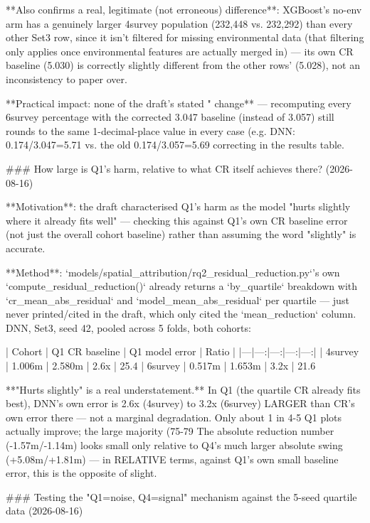 **Also confirms a real, legitimate (not erroneous) difference**: XGBoost's no-env arm has a
genuinely larger 4survey population (232,448 vs. 232,292) than every other Set3 row, since it
isn't filtered for missing environmental data (that filtering only applies once environmental
features are actually merged in) — its own CR baseline (5.030) is correctly slightly different
from the other rows' (5.028), not an inconsistency to paper over.

**Practical impact: none of the draft's stated "%
change** — recomputing every 6survey percentage with the corrected 3.047 baseline (instead of
3.057) still rounds to the same 1-decimal-place value in every case (e.g. DNN: 0.174/3.047=5.71%
vs. the old 0.174/3.057=5.69%
correcting in the results table.

### How large is Q1's harm, relative to what CR itself achieves there? (2026-08-16)

**Motivation**: the draft characterised Q1's harm as the model "hurts slightly where it already
fits well" — checking this against Q1's own CR baseline error (not just the overall cohort
baseline) rather than assuming the word "slightly" is accurate.

**Method**: `models/spatial_attribution/rq2_residual_reduction.py`'s own `compute_residual_reduction()`
already returns a `by_quartile` breakdown with `cr_mean_abs_residual` and `model_mean_abs_residual`
per quartile — just never printed/cited in the draft, which only cited the `mean_reduction` column.
DNN, Set3, seed 42, pooled across 5 folds, both cohorts:

| Cohort | Q1 CR baseline | Q1 model error | Ratio | %
|---|---:|---:|---:|---:|
| 4survey | 1.006m | 2.580m | 2.6x | 25.4%
| 6survey | 0.517m | 1.653m | 3.2x | 21.6%

**"Hurts slightly" is a real understatement.** In Q1 (the quartile CR already fits best), DNN's
own error is 2.6x (4survey) to 3.2x (6survey) LARGER than CR's own error there — not a marginal
degradation. Only about 1 in 4-5 Q1 plots actually improve; the large majority (75-79%
The absolute reduction number (-1.57m/-1.14m) looks small only relative to Q4's much larger
absolute swing (+5.08m/+1.81m) — in RELATIVE terms, against Q1's own small baseline error, this is
the opposite of slight.

### Testing the "Q1=noise, Q4=signal" mechanism against the 5-seed quartile data (2026-08-16)

